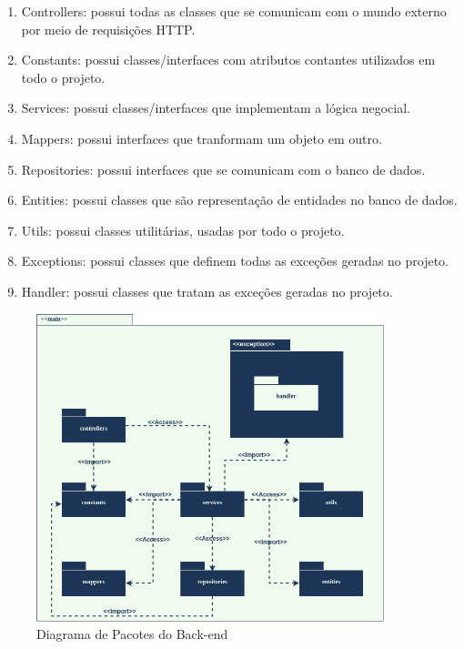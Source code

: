 \begin{enumerate}
  \item Controllers: possui todas as classes que se comunicam com o mundo externo por meio de requisições HTTP.
  \item Constants: possui classes/interfaces com atributos contantes utilizados em todo o projeto.
  \item Services: possui classes/interfaces que implementam a lógica negocial.
  \item Mappers: possui interfaces que tranformam um objeto em outro.
  \item Repositories: possui interfaces que se comunicam com o banco de dados.
  \item Entities: possui classes que são representação de entidades no banco de dados.
  \item Utils: possui classes utilitárias, usadas por todo o projeto.
  \item Exceptions: possui classes que definem todas as exceções geradas no projeto.
  \item Handler: possui classes que tratam as exceções geradas no projeto.
\end{enumerate}

\begin{figure}[H]
    \centering
    \includegraphics[width=0.9\textwidth]{figuras/diagrama-pacote.png}
    \caption{Diagrama de Pacotes do Back-end}
    \label{fig:pacotes-diagrama}
\end{figure}



